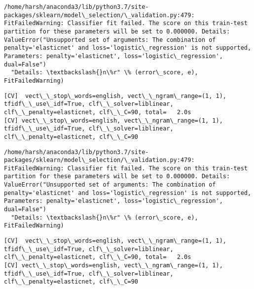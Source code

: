 \documentclass[11pt]{article}
\begin{document}
    \begin{Verbatim}[commandchars=\\\{\}]
/home/harsh/anaconda3/lib/python3.7/site-packages/sklearn/model\_selection/\_validation.py:479: FitFailedWarning: Classifier fit failed. The score on this train-test partition for these parameters will be set to 0.000000. Details: 
ValueError("Unsupported set of arguments: The combination of penalty='elasticnet' and loss='logistic\_regression' is not supported, Parameters: penalty='elasticnet', loss='logistic\_regression', dual=False")
  "Details: \textbackslash{}n\%r" \% (error\_score, e), FitFailedWarning)

    \end{Verbatim}

    \begin{Verbatim}[commandchars=\\\{\}]
[CV]  vect\_\_stop\_words=english, vect\_\_ngram\_range=(1, 1), tfidf\_\_use\_idf=True, clf\_\_solver=liblinear, clf\_\_penalty=elasticnet, clf\_\_C=90, total=   2.0s
[CV] vect\_\_stop\_words=english, vect\_\_ngram\_range=(1, 1), tfidf\_\_use\_idf=True, clf\_\_solver=liblinear, clf\_\_penalty=elasticnet, clf\_\_C=90 

    \end{Verbatim}

    \begin{Verbatim}[commandchars=\\\{\}]
/home/harsh/anaconda3/lib/python3.7/site-packages/sklearn/model\_selection/\_validation.py:479: FitFailedWarning: Classifier fit failed. The score on this train-test partition for these parameters will be set to 0.000000. Details: 
ValueError("Unsupported set of arguments: The combination of penalty='elasticnet' and loss='logistic\_regression' is not supported, Parameters: penalty='elasticnet', loss='logistic\_regression', dual=False")
  "Details: \textbackslash{}n\%r" \% (error\_score, e), FitFailedWarning)

    \end{Verbatim}

    \begin{Verbatim}[commandchars=\\\{\}]
[CV]  vect\_\_stop\_words=english, vect\_\_ngram\_range=(1, 1), tfidf\_\_use\_idf=True, clf\_\_solver=liblinear, clf\_\_penalty=elasticnet, clf\_\_C=90, total=   2.0s
[CV] vect\_\_stop\_words=english, vect\_\_ngram\_range=(1, 1), tfidf\_\_use\_idf=True, clf\_\_solver=liblinear, clf\_\_penalty=elasticnet, clf\_\_C=90 

    \end{Verbatim}
\end{document}
